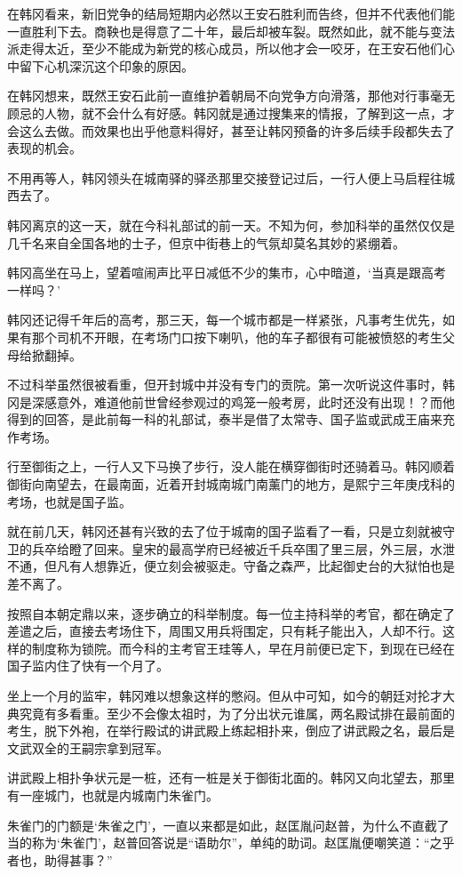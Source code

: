 在韩冈看来，新旧党争的结局短期内必然以王安石胜利而告终，但并不代表他们能一直胜利下去。商鞅也是得意了二十年，最后却被车裂。既然如此，就不能与变法派走得太近，至少不能成为新党的核心成员，所以他才会一咬牙，在王安石他们心中留下心机深沉这个印象的原因。

在韩冈想来，既然王安石此前一直维护着朝局不向党争方向滑落，那他对行事毫无顾忌的人物，就不会什么有好感。韩冈就是通过搜集来的情报，了解到这一点，才会这么去做。而效果也出乎他意料得好，甚至让韩冈预备的许多后续手段都失去了表现的机会。

不用再等人，韩冈领头在城南驿的驿丞那里交接登记过后，一行人便上马启程往城西去了。

韩冈离京的这一天，就在今科礼部试的前一天。不知为何，参加科举的虽然仅仅是几千名来自全国各地的士子，但京中街巷上的气氛却莫名其妙的紧绷着。

韩冈高坐在马上，望着喧闹声比平日减低不少的集市，心中暗道，‘当真是跟高考一样吗？’

韩冈还记得千年后的高考，那三天，每一个城市都是一样紧张，凡事考生优先，如果有那个司机不开眼，在考场门口按下喇叭，他的车子都很有可能被愤怒的考生父母给掀翻掉。

不过科举虽然很被看重，但开封城中并没有专门的贡院。第一次听说这件事时，韩冈是深感意外，难道他前世曾经参观过的鸡笼一般考房，此时还没有出现！？而他得到的回答，是此前每一科的礼部试，泰半是借了太常寺、国子监或武成王庙来充作考场。

行至御街之上，一行人又下马换了步行，没人能在横穿御街时还骑着马。韩冈顺着御街向南望去，在最南面，近着开封城南城门南薰门的地方，是熙宁三年庚戌科的考场，也就是国子监。

就在前几天，韩冈还甚有兴致的去了位于城南的国子监看了一看，只是立刻就被守卫的兵卒给瞪了回来。皇宋的最高学府已经被近千兵卒围了里三层，外三层，水泄不通，但凡有人想靠近，便立刻会被驱走。守备之森严，比起御史台的大狱怕也是差不离了。

按照自本朝定鼎以来，逐步确立的科举制度。每一位主持科举的考官，都在确定了差遣之后，直接去考场住下，周围又用兵将围定，只有耗子能出入，人却不行。这样的制度称为锁院。而今科的主考官王珪等人，早在月前便已定下，到现在已经在国子监内住了快有一个月了。

坐上一个月的监牢，韩冈难以想象这样的憋闷。但从中可知，如今的朝廷对抡才大典究竟有多看重。至少不会像太祖时，为了分出状元谁属，两名殿试排在最前面的考生，脱下外袍，在举行殿试的讲武殿上练起相扑来，倒应了讲武殿之名，最后是文武双全的王嗣宗拿到冠军。

讲武殿上相扑争状元是一桩，还有一桩是关于御街北面的。韩冈又向北望去，那里有一座城门，也就是内城南门朱雀门。

朱雀门的门额是‘朱雀之门’，一直以来都是如此，赵匡胤问赵普，为什么不直截了当的称为‘朱雀门’，赵普回答说是“语助尔”，单纯的助词。赵匡胤便嘲笑道：“之乎者也，助得甚事？”

